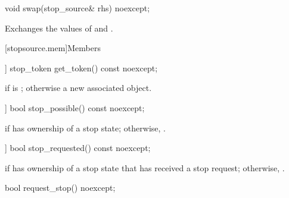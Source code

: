 %
\begin{itemdecl}
void swap(stop_source& rhs) noexcept;
\end{itemdecl}

\begin{itemdescr}
\pnum
\effects
Exchanges the values of  and .
\end{itemdescr}

[stopsource.mem]{Members}

%
\begin{itemdecl}
[[nodiscard]] stop_token get_token() const noexcept;
\end{itemdecl}

\begin{itemdescr}
\pnum
\returns
{} if  is ;
otherwise a new associated  object.
\end{itemdescr}

%
\begin{itemdecl}
[[nodiscard]] bool stop_possible() const noexcept;
\end{itemdecl}

\begin{itemdescr}
\pnum
\returns
{} if  has ownership of a stop state;
otherwise, .
\end{itemdescr}

%
\begin{itemdecl}
[[nodiscard]] bool stop_requested() const noexcept;
\end{itemdecl}

\begin{itemdescr}
\pnum
\returns
{} if  has ownership of a stop state
that has received a stop request;
otherwise, .
\end{itemdescr}

%
\begin{itemdecl}
bool request_stop() noexcept;
\end{itemdecl}

